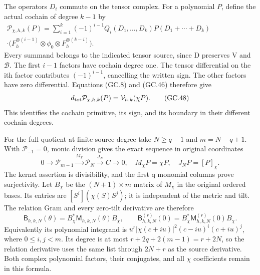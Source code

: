 \documentclass[11pt]{article}
\begin{document}
The operators $D_i$ commute on the tensor complex. For a polynomial
$P$, define the actual cochain of degree $k-1$ by
\[
 \begin{split}
 \mathcal P_{\chi,h,k}(P)=
 \sum_{i=1}^k(-1)^{i-1}Q_i(D_1,\ldots,D_k)
 P(D_1+\cdots+D_k)\quad\quad\quad\quad\quad\quad\quad\\[-4pt]
 \cdot\bigl(F_h^{\otimes(i-1)}\otimes\phi_0
                                \otimes F_h^{\otimes(k-i)}\bigr).
 \end{split}                                                   \tag{GC.47}
\]
Every summand belongs to the indicated tensor source, since D
preserves V and $\mathscr B$. The first $i-1$ factors have cochain
degree one. The tensor differential on the ith factor contributes
$(-1)^{i-1}$, cancelling the written sign. The other factors have
zero differential. Equations (GC.8) and (GC.46) therefore give
\[
 d_{\rm tot}\mathcal P_{\chi,h,k}(P)
       =\mathcal V_{h,k}(\chi P).                             \tag{GC.48}
\]
This identifies the cochain primitive, its sign, and its boundary in
their different cochain degrees.

For the full quotient at finite source degree take $N\ge q-1$ and
$m=N-q+1$. With $\mathcal P_{-1}=0$, monic division gives the
exact sequence in original coordinates
\[
 0\longrightarrow\mathcal P_{m-1}
 \xrightarrow{M_\chi}\mathcal P_N
 \xrightarrow{J_N}C\longrightarrow0,
 \quad M_\chi P=\chi P,\quad J_NP=[P]_\chi.                    \tag{GC.49}
\]
The kernel assertion is divisibility, and the first q monomial
columns prove surjectivity. Let $B_\chi$ be the $(N+1)\times m$
matrix of $M_\chi$ in the original ordered bases. Its entries are
$[S^i](\chi(S)S^j)$; it is independent of the metric and tilt.
The relation Gram and every zero-tilt derivative are therefore
\[
 \mathsf B_{h,k,N}(\theta)=B_\chi^*\mathsf M_{h,k,N}(\theta)B_\chi,
 \qquad
 \mathsf B_{h,k,N}^{(r)}(0)=B_\chi^*\mathsf M_{h,k,N}^{(r)}(0)B_\chi.
                                                               \tag{GC.50}
\]
Equivalently its polynomial integrand is
$u^r|\chi(c+iu)|^2(c-iu)^i(c+iu)^j$, where $0\le i,j<m$.
Its degree is at most $r+2q+2(m-1)=r+2N$, so the relation derivative
uses the same list through $2N+r$ as the source derivative. Both
complex polynomial factors, their conjugates, and all $\chi$ coefficients
remain in this formula.
\end{document}
